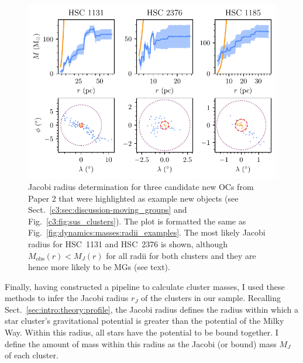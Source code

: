 \begin{figure}[t]
    \centering
    \includegraphics[width=\textwidth]{fig/c4/masses_jacobi_determination.pdf}
    \caption[Jacobi radius determination for three candidate new OCs from Paper 2 that were highlighted as example new objects]{Jacobi radius determination for three candidate new OCs from Paper 2 that were highlighted as example new objects (see Sect.~\ref{c3:sec:discussion-moving_groups} and Fig.~\ref{c3:fig:sus_clusters}). The plot is formatted the same as Fig.~\ref{fig:dynamics:masses:radii_examples}. The most likely Jacobi radius for HSC~1131 and HSC~2376 is shown, although $M_\text{obs}(r)<M_J(r)$ for all radii for both clusters and they are hence more likely to be MGs (see text).}
    \label{fig:dynamics:masses:radii_examples_sus}
\end{figure}

Finally, having constructed a pipeline to calculate cluster masses, I used these methods to infer the Jacobi radius $r_J$ of the clusters in our sample. Recalling Sect.~\ref{sec:intro:theory:profile}, the Jacobi radius defines the radius within which a star cluster's gravitational potential is greater than the potential of the Milky Way. Within this radius, all stars have the potential to be bound together. I define the amount of mass within this radius as the Jacobi (or bound) mass $M_J$ of each cluster.

